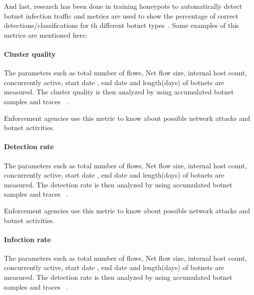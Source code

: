 And last, research has been done in training honeypots to automatically detect botnet infection traffic and metrics are used to show the percentage of correct detections/classifications for th different botnet types~\cite{haltas2014automated}.
Some examples of this metrics are mentioned here:
\paragraph{Cluster quality }

The  parameters such as total number of flows, Net flow size, internal host count, concurrently  active, start date , end date and length(days) of botnets are measured. The cluster quality is then analyzed by using accumulated botnet samples and traces ~\cite{haltas2014automated}.

Enforcement agencies use this metric to know about possible network attacks and botnet activities.


\paragraph{ Detection rate }

The  parameters such as total number of flows, Net flow size, internal host count, concurrently  active, start date , end date and length(days) of botnets are measured. The detection rate is then analyzed by using accumulated botnet samples and traces ~\cite{haltas2014automated}.

Enforcement agencies use this metric to know about possible network attacks and botnet activities.



\paragraph{ Infection rate }

The  parameters such as total number of flows, Net flow size, internal host count, concurrently  active, start date , end date and length(days) of botnets are measured. The detection rate is then analyzed by using accumulated botnet samples and traces ~\cite{haltas2014automated}.

